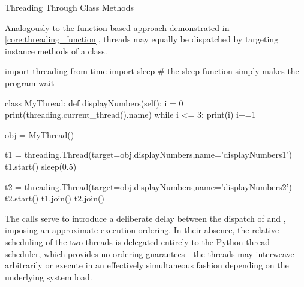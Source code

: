 \documentclass[10pt]{article}
\begin{document}
      \begin{core}{Threading Through Class Methods}

        Analogously to the function-based approach demonstrated in \autoref{core:threading_function}, threads may equally be dispatched by targeting instance methods of a class.

        \begin{pyconsole}

          import threading
          from time import sleep # the sleep function simply makes the program wait

          class MyThread:
              def displayNumbers(self):
                  i = 0
                  print(threading.current_thread().name)
                  while i <= 3:
                      print(i)
                      i+=1

          obj = MyThread()

          t1 = threading.Thread(target=obj.displayNumbers,name='displayNumbers1')
          t1.start()
          sleep(0.5)

          t2 = threading.Thread(target=obj.displayNumbers,name='displayNumbers2')
          t2.start()
          t1.join()
          t2.join()

        \end{pyconsole}

        The  calls serve to introduce a deliberate delay between the dispatch of  and , imposing an approximate execution ordering. In their absence, the relative scheduling of the two threads is delegated entirely to the Python thread scheduler, which provides no ordering guarantees---the threads may interweave arbitrarily or execute in an effectively simultaneous fashion depending on the underlying system load.

      \end{core}
\end{document}
